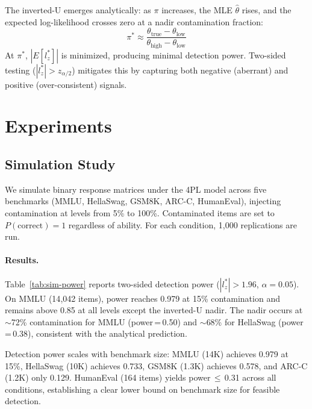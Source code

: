 \documentclass[11pt,a4paper]{article}
\begin{document}
The inverted-U emerges analytically: as $\pi$ increases, the MLE $\hat{\theta}$ rises, and the expected log-likelihood crosses zero at a nadir contamination fraction:
\begin{equation}
\pi^* \approx \frac{\theta_{\text{true}} - \theta_{\text{low}}}{\theta_{\text{high}} - \theta_{\text{low}}}
\end{equation}
At $\pi^*$, $|E[l_z^*]|$ is minimized, producing minimal detection power.
Two-sided testing ($|l_z^*| > z_{\alpha/2}$) mitigates this by capturing both negative (aberrant) and positive (over-consistent) signals.

\section{Experiments}

\subsection{Simulation Study}
\label{sec:simulation}

We simulate binary response matrices under the 4PL model across five benchmarks (MMLU, HellaSwag, GSM8K, ARC-C, HumanEval), injecting contamination at levels from 5\% to 100\%.
Contaminated items are set to $P(\text{correct})=1$ regardless of ability.
For each condition, 1{,}000 replications are run.

\paragraph{Results.}
Table~\ref{tab:sim-power} reports two-sided detection power ($|l_z^*| > 1.96$, $\alpha=0.05$).
On MMLU (14{,}042 items), power reaches 0.979 at 15\% contamination and remains above 0.85 at all levels except the inverted-U nadir.
The nadir occurs at $\sim$72\% contamination for MMLU (power\,=\,0.50) and $\sim$68\% for HellaSwag (power\,=\,0.38), consistent with the analytical prediction.

Detection power scales with benchmark size: MMLU (14K) achieves 0.979 at 15\%, HellaSwag (10K) achieves 0.733, GSM8K (1.3K) achieves 0.578, and ARC-C (1.2K) only 0.129.
HumanEval (164 items) yields power\,$\leq$\,0.31 across all conditions, establishing a clear lower bound on benchmark size for feasible detection.
\end{document}
